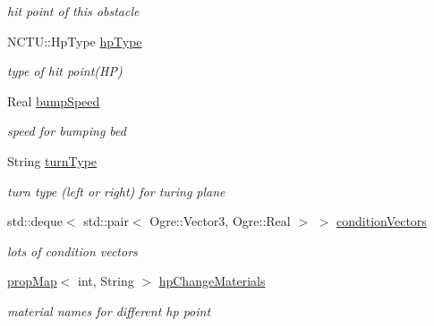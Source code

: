 \begin{DoxyCompactItemize}
\begin{DoxyCompactList}\small\item\em hit point of this obstacle \end{DoxyCompactList}\item 
N\+C\+T\+U\+::\+Hp\+Type \hyperlink{class_ogre_1_1_obstacle_property_a61d0e36adb78beb9b4a6a6022b0e867c}{hp\+Type}\hypertarget{class_ogre_1_1_obstacle_property_a61d0e36adb78beb9b4a6a6022b0e867c}{}\label{class_ogre_1_1_obstacle_property_a61d0e36adb78beb9b4a6a6022b0e867c}

\begin{DoxyCompactList}\small\item\em type of hit point(\+H\+P) \end{DoxyCompactList}\item 
Real \hyperlink{class_ogre_1_1_obstacle_property_abf521aa3acbf7f824449f67ed8d631e2}{bump\+Speed}\hypertarget{class_ogre_1_1_obstacle_property_abf521aa3acbf7f824449f67ed8d631e2}{}\label{class_ogre_1_1_obstacle_property_abf521aa3acbf7f824449f67ed8d631e2}

\begin{DoxyCompactList}\small\item\em speed for bumping bed \end{DoxyCompactList}\item 
String \hyperlink{class_ogre_1_1_obstacle_property_a669e6b77766ce91fc971002b739992d6}{turn\+Type}\hypertarget{class_ogre_1_1_obstacle_property_a669e6b77766ce91fc971002b739992d6}{}\label{class_ogre_1_1_obstacle_property_a669e6b77766ce91fc971002b739992d6}

\begin{DoxyCompactList}\small\item\em turn type (left or right) for turing plane \end{DoxyCompactList}\item 
std\+::deque$<$ std\+::pair$<$ Ogre\+::\+Vector3, Ogre\+::\+Real $>$ $>$ \hyperlink{class_ogre_1_1_obstacle_property_a6732ff592c84b16e7b191974be9f7cbf}{condition\+Vectors}\hypertarget{class_ogre_1_1_obstacle_property_a6732ff592c84b16e7b191974be9f7cbf}{}\label{class_ogre_1_1_obstacle_property_a6732ff592c84b16e7b191974be9f7cbf}

\begin{DoxyCompactList}\small\item\em lots of condition vectors \end{DoxyCompactList}\item 
\hyperlink{classprop_map}{prop\+Map}$<$ int, String $>$ \hyperlink{class_ogre_1_1_obstacle_property_ad434aeef04327df2282521d74845b309}{hp\+Change\+Materials}\hypertarget{class_ogre_1_1_obstacle_property_ad434aeef04327df2282521d74845b309}{}\label{class_ogre_1_1_obstacle_property_ad434aeef04327df2282521d74845b309}

\begin{DoxyCompactList}\small\item\em material names for different hp point \end{DoxyCompactList}\end{DoxyCompactItemize}


